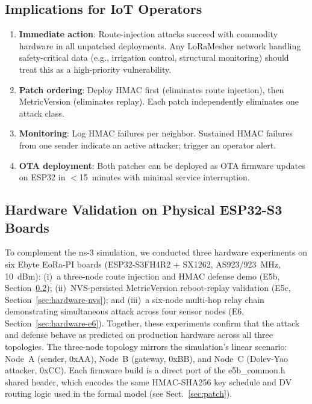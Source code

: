 \documentclass[10pt,journal,compsoc]{IEEEtran}
\begin{document}
\subsection{Implications for IoT Operators}

\begin{enumerate}
  \item \textbf{Immediate action}: Route-injection attacks succeed
    with commodity hardware in all unpatched deployments. Any
    LoRaMesher network handling safety-critical data (e.g.,
    irrigation control, structural monitoring) should treat this
    as a high-priority vulnerability.
  \item \textbf{Patch ordering}: Deploy HMAC first (eliminates
    route injection), then MetricVersion (eliminates replay).
    Each patch independently eliminates one attack class.
  \item \textbf{Monitoring}: Log HMAC failures per neighbor.
    Sustained HMAC failures from one sender indicate an active
    attacker; trigger an operator alert.
  \item \textbf{OTA deployment}: Both patches can be deployed as
    OTA firmware updates on ESP32 in $<$15~minutes with minimal
    service interruption.
\end{enumerate}

\subsection{Hardware Validation on Physical ESP32-S3 Boards}
\label{sec:hardware-validation}

To complement the ns-3 simulation, we conducted three hardware
experiments on six Ebyte EoRa-PI boards (ESP32-S3FH4R2 + SX1262,
AS923/923~MHz, 10~dBm):
(i)~a three-node route injection and HMAC defense demo (E5b,
Section~\ref{sec:hardware-validation});
(ii)~NVS-persisted MetricVersion reboot-replay validation (E5c,
Section~\ref{sec:hardware-nvs}); and
(iii)~a six-node multi-hop relay chain demonstrating simultaneous
attack across four sensor nodes (E6,
Section~\ref{sec:hardware-e6}).
Together, these experiments confirm that the attack and defense behave
as predicted on production hardware across all three topologies.
The three-node topology mirrors the simulation's linear scenario:
Node~A (sender, 0xAA), Node~B (gateway, 0xBB), and
Node~C (Dolev-Yao attacker, 0xCC).
Each firmware build is a direct port of the e5b\_common.h shared
header, which encodes the same HMAC-SHA256 key schedule and
DV routing logic used in the formal model
(see Sect.~\ref{sec:patch}).
\end{document}
